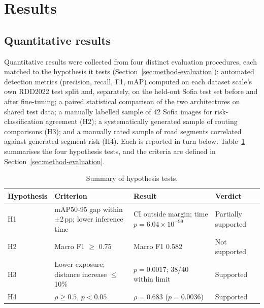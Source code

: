 \documentclass[10pt,a4paper,twocolumn]{article}
\begin{document}
\section{Results}
\label{sec:results}

\subsection{Quantitative results}
\label{sec:res-quantitative}

Quantitative results were collected from four distinct evaluation
procedures, each matched to the hypothesis it tests
(Section~\ref{sec:method-evaluation}): automated detection metrics
(precision, recall, F1, mAP) computed on each dataset scale's own
RDD2022 test split and, separately, on the held-out Sofia test set
before and after fine-tuning; a paired statistical comparison of the two
architectures on shared test data; a manually labelled sample of 42
Sofia images for risk-classification agreement (H2); a systematically
generated sample of routing comparisons (H3); and a manually rated
sample of road segments correlated against generated segment risk (H4).
Each is reported in turn below. Table~\ref{tab:hyp-summary} summarises
the four hypothesis tests, and the criteria are defined in
Section~\ref{sec:method-evaluation}.

\begin{table}[t]
  \centering
  \small
  \caption{Summary of hypothesis tests.}
  \label{tab:hyp-summary}
  \begin{tabular}{@{}p{1.7cm}p{2.1cm}p{1.9cm}p{1.3cm}@{}}
    \toprule
    Hypothesis & Criterion & Result & Verdict \\
    \midrule
    H1 & mAP50-95 gap within $\pm$2\,pp; lower inference time & CI outside margin; time $p{=}6.04{\times}10^{-99}$ & Partially supported \\
    H2 & Macro F1 $\geq$ 0.75 & Macro F1 0.582 & Not supported \\
    H3 & Lower exposure; distance increase $\leq$ 10\% & $p{=}0.0017$; 38/40 within limit & Supported \\
    H4 & $\rho \geq 0.5$, $p < 0.05$ & $\rho{=}0.683$ ($p{=}0.0036$) & Supported \\
    \bottomrule
  \end{tabular}
\end{table}
\end{document}
